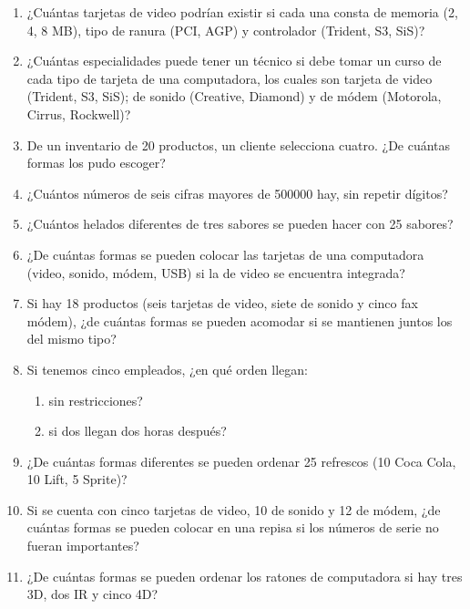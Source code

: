 \begin{Ejer}
\begin{enumerate}

\item ¿Cu\'antas tarjetas de video podr\'ian existir si cada una consta de memoria (2, 4, 8 MB), tipo de ranura (PCI, AGP) y controlador (Trident, S3, SiS)?

\item ¿Cu\'antas especialidades puede tener un t\'ecnico si debe tomar un curso de cada tipo de tarjeta de una computadora, los cuales son tarjeta de video (Trident, S3, SiS); de sonido (Creative, Diamond) y de m\'odem (Motorola, Cirrus, Rockwell)?

\item De un inventario de 20 productos, un cliente selecciona cuatro. ¿De cu\'antas formas los pudo escoger?

\item ¿Cu\'antos n\'umeros de seis cifras mayores de 500000 hay, sin repetir d\'igitos?

\item ¿Cu\'antos helados diferentes de tres sabores se pueden hacer con 25 sabores?

\item ¿De cu\'antas formas se pueden colocar las tarjetas de una computadora (video, sonido, m\'odem, USB) si la de video se encuentra integrada?

\item Si hay 18 productos (seis tarjetas de video, siete de sonido y cinco fax m\'odem), ¿de cu\'antas formas se pueden acomodar si se mantienen juntos los del mismo tipo?

\item Si tenemos cinco empleados, ¿en qu\'e orden llegan:
\begin{enumerate}
\item sin restricciones?
\item si dos llegan dos horas despu\'es?
\end{enumerate}

\item ¿De cu\'antas formas diferentes se pueden ordenar 25 refrescos (10 Coca Cola, 10 Lift, 5 Sprite)?

\item Si se cuenta con cinco tarjetas de video, 10 de sonido y 12 de m\'odem, ¿de cu\'antas formas se pueden colocar en una repisa si los n\'umeros de serie no fueran importantes?

\item ¿De cu\'antas formas se pueden ordenar los ratones de computadora si hay tres 3D, dos IR y cinco 4D?


\end{enumerate}
\end{Ejer}
